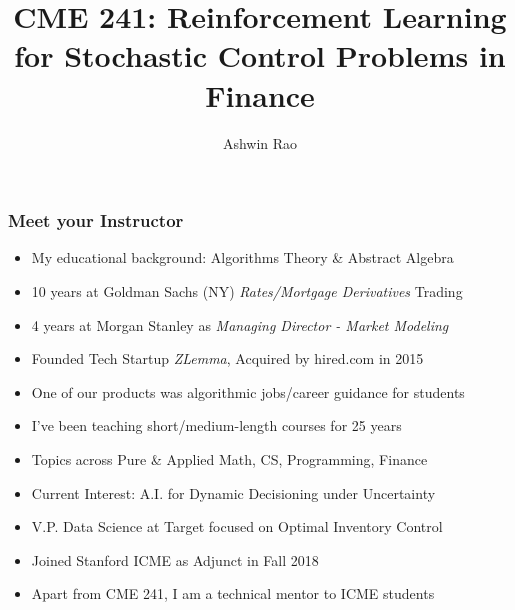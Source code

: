 \documentclass[handout]{beamer}
\title[RL for Finance]{CME 241: Reinforcement Learning for Stochastic Control Problems in Finance} %
\author{Ashwin Rao} %
\institute[Stanford] %
{ICME, Stanford University
}
\date{} %
\begin{document}
\begin{frame}
\titlepage %
\end{frame}


\begin{frame}
\frametitle{Meet your Instructor}
\pause
\begin{itemize}[<+->]
\item My educational background: Algorithms Theory \& Abstract Algebra
\item 10 years at Goldman Sachs (NY) {\em Rates/Mortgage Derivatives} Trading
\item 4 years at Morgan Stanley as {\em Managing Director - Market Modeling}
\item Founded Tech Startup {\em ZLemma}, Acquired by hired.com in 2015
\item One of our products was algorithmic jobs/career guidance for students
\item I've been teaching short/medium-length courses for 25 years
\item Topics across Pure \& Applied Math, CS, Programming, Finance
\item Current Interest: A.I. for Dynamic Decisioning under Uncertainty
\item V.P. Data Science at Target focused on Optimal Inventory Control
\item Joined Stanford ICME as Adjunct in Fall 2018
\item Apart from CME 241, I am a technical mentor to ICME students
\end{itemize}
\end{frame}
\end{document}

